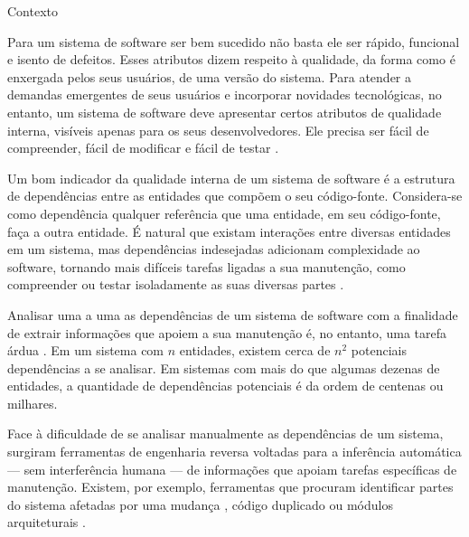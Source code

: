 \begin{section}{Contexto}

		Para um sistema de software ser bem sucedido não basta ele ser rápido, funcional e isento de defeitos. Esses atributos dizem respeito à qualidade, da forma como é enxergada pelos seus usuários, de uma versão do sistema. Para atender a demandas emergentes de seus usuários e incorporar novidades tecnológicas, no entanto, um sistema de software deve apresentar certos atributos de qualidade interna, visíveis apenas para os seus desenvolvedores. Ele precisa ser fácil de compreender, fácil de modificar e fácil de testar \cite{Parnas1994}.

		Um bom indicador da qualidade interna de um sistema de software é a estrutura de dependências entre as entidades que compõem o seu código-fonte. Considera-se como dependência qualquer referência que uma entidade, em seu código-fonte, faça a outra entidade. É natural que existam interações entre diversas entidades em um sistema, mas dependências indesejadas adicionam complexidade ao software, tornando mais difíceis tarefas ligadas a sua manutenção, como compreender ou testar isoladamente as suas diversas partes \cite{Chidamber1994}. %

		Analisar uma a uma as dependências de um sistema de software com a finalidade de extrair informações que apoiem a sua manutenção é, no entanto, uma tarefa árdua \cite{Tonella2007}. Em um sistema com $n$ entidades, existem cerca de $n^2$ potenciais dependências a se analisar. Em sistemas com mais do que algumas dezenas de entidades, a quantidade de dependências potenciais é da ordem de centenas ou milhares. %
		
		Face à dificuldade de se analisar manualmente as dependências de um sistema, surgiram ferramentas de engenharia reversa voltadas para a inferência automática --- sem interferência humana --- de informações que apoiam tarefas específicas de manutenção. Existem, por exemplo, ferramentas que procuram identificar partes do sistema afetadas por uma mudança \cite{Arnold1993}, código duplicado \cite{Roy2007} ou módulos arquiteturais \cite{Maqbool2007}. 



\end{section}
